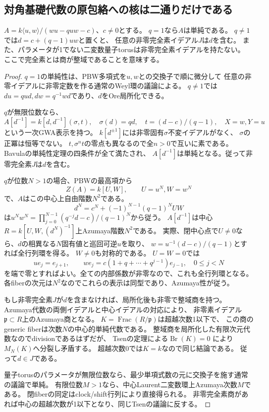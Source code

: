 \subsection{対角基礎代数の原包絡への核は二通りだけである}
\label{subsec:h3-positive3-base-kernel}
\begin{lemma}\label{lem:h3-qweyl-domain-quotients}
$A=k\langle u,w\rangle/(wu-quw-c)$、$c\ne0$とする。
$q=1$なら$A$は単純である。
$q\ne1$では$d=c+(q-1)uw$と置くと、
任意の非零完全素イデアル$J$は$d$を含む。
また、パラメータが1でない二変数量子torusは非零完全素イデアルを持たない。
ここで完全素とは商が整域であることを意味する。
\end{lemma}
\begin{proof}
$q=1$の単純性は、PBW多項式を$u,w$との交換子で順に微分して
任意の非零イデアルに非零定数を作る通常のWeyl環の議論による。
$q\ne1$では$du=qud,dw=q^{-1}wd$であり、$d$をOre局所化できる。

$q$が無限位数なら、
\[
 A[d^{-1}]=k[d,d^{-1}](\sigma,t),\quad
 \sigma(d)=qd,\quad t=(d-c)/(q-1),\quad X=w,Y=u
\]
という一次GWA表示を持つ。
$k[d^{\pm1}]$には非零固有$\sigma$不変イデアルがなく、
$\sigma$の正冪は恒等でない。
$t,\sigma^nt$の零点も異なるので全$n>0$で互いに素である。
Bavulaの単純性定理\cite[Theorem 2.1]{BavulaGWAOverview}の四条件が全て満たされ、
$A[d^{-1}]$は単純となる。従って非零完全素$J$は$d$を含む。

$q$が位数$N>1$の場合、PBWの最高項から
\[
 Z(A)=k[U,W],\qquad U=u^N,W=w^N
\]
で、$A$はこの中心上自由階数$N^2$である。
\[
 d^N=c^N+(-1)^{N-1}(q-1)^NUW
\]
は$u^Nw^N=\prod_{j=0}^{N-1}(q^{-j}d-c)/(q-1)^N$から従う。
$A[d^{-1}]$は中心$R=k[U,W,(d^N)^{-1}]$上Azumaya階数$N^2$である。
実際、閉中心点で$U\ne0$なら、$d$の相異なる$N$固有値と巡回可逆$u$を取り、
$w=u^{-1}(d-c)/(q-1)$とすれば全行列環を得る。
$W\ne0$も対称的である。
$U=W=0$では
\[
 ue_j=e_{j+1},\qquad
 we_j=c(1+q+\cdots+q^{j-1})e_{j-1},\quad0\le j<N
\]
を端で零とすればよい。全ての内部係数が非零なので、これも全行列環となる。
各fiberの次元は$N^2$なのでこれらの表示は同型であり、Azumaya性が従う。

もし非零完全素$J$が$d$を含まなければ、局所化後も非零で整域商を持つ。
Azumaya代数の両側イデアルと中心イデアルの対応により、
非零素イデアル$\mathfrak p\subset R$上のAzumaya商となる。
$K=\operatorname{Frac}(R/\mathfrak p)$は超越次数1以下で、
この商のgeneric fiberは次数$N$の中心的単純代数である。
整域商を局所化した有限次元代数なのでdivisionであるはずだが、
Tsenの定理による$\operatorname{Br}(K)=0$
\cite[Tag 03RF]{StacksTsenBrauer}により$M_N(K)$へ分裂し矛盾する。
超越次数0では$K=k$なので同じ結論である。
従って$d\in J$である。

量子torusのパラメータが無限位数なら、最少単項式数の元に交換子を施す通常の議論で単純。
有限位数$M>1$なら、中心Laurent二変数環上Azumaya次数$M$である。
閉fiberの同定はclock/shift行列により直接得られる。
非零完全素商があれば中心の超越次数が1以下となり、同じTsenの議論に反する。
\end{proof}

